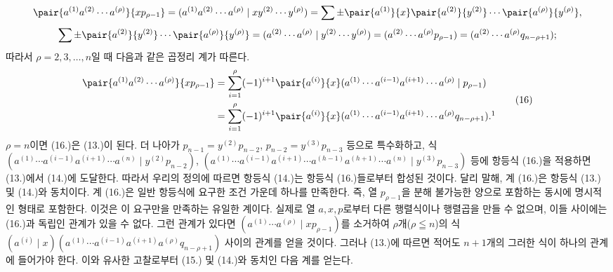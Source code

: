 
\[
\pair{a^{(1)}a^{(2)}\cdots a^{(\rho)}}{xp_{\rho-1}}
=(a^{(1)}a^{(2)}\cdots a^{(\rho)}\mid xy^{(2)}\cdots y^{(\rho)})
=\sum\pm\pair{a^{(1)}}{x}\pair{a^{(2)}}{y^{(2)}}\cdots\pair{a^{(\rho)}}{y^{(\rho)}},
\]
\[
\sum\pm\pair{a^{(2)}}{y^{(2)}}\cdots\pair{a^{(\rho)}}{y^{(\rho)}}
=(a^{(2)}\cdots a^{(\rho)}\mid y^{(2)}\cdots y^{(\rho)})
=(a^{(2)}\cdots a^{(\rho)}p_{\rho-1})=(a^{(2)}\cdots a^{(\rho)}q_{n-\rho+1});
\]
따라서 $\rho=2,3,\ldots,n$일 때 다음과 같은 곱정리 계가 따른다.
\begin{equation}
\begin{aligned}
\pair{a^{(1)}a^{(2)}\cdots a^{(\rho)}}{xp_{\rho-1}}
 &=\sum_{i=1}^{\rho}(-1)^{i+1}\pair{a^{(i)}}{x}(a^{(1)}\cdots a^{(i-1)}a^{(i+1)}\cdots a^{(\rho)}\mid p_{\rho-1})\\
 &=\sum_{i=1}^{\rho}(-1)^{i+1}\pair{a^{(i)}}{x}(a^{(1)}\cdots a^{(i-1)}a^{(i+1)}\cdots a^{(\rho)}q_{n-\rho+1}).\footnotemark
\end{aligned}
\tag{16}
\end{equation}
$\rho=n$이면 (16.)은 (13.)이 된다. 더 나아가 $p_{n-1}=y^{(2)}p_{n-2}$, $p_{n-2}=y^{(3)}p_{n-3}$ 등으로 특수화하고, 식 $(a^{(1)}\cdots a^{(i-1)}a^{(i+1)}\cdots a^{(n)}\mid y^{(2)}p_{n-2})$, $(a^{(1)}\cdots a^{(i-1)}a^{(i+1)}\cdots a^{(h-1)}a^{(h+1)}\cdots a^{(n)}\mid y^{(3)}p_{n-3})$ 등에 항등식 (16.)을 적용하면 (13.)에서 (14.)에 도달한다. 따라서 우리의 정의에 따르면 항등식 (14.)는 항등식 (16.)들로부터 합성된 것이다. 달리 말해, 계 (16.)은 항등식 (13.) 및 (14.)와 동치이다. 계 (16.)은 일반 항등식에 요구한 조건 가운데 하나를 만족한다. 즉, 열 $p_{\rho-1}$을 분해 불가능한 양으로 포함하는 동시에 명시적인 형태로 포함한다. 이것은 이 요구만을 만족하는 유일한 계이다. 실제로 열 $a,x,p$로부터 다른 행렬식이나 행렬곱을 만들 수 없으며, 이들 사이에는 (16.)과 독립인 관계가 있을 수 없다. 그런 관계가 있다면 $(a^{(1)}\cdots a^{(\rho)}\mid xp_{\rho-1})$를 소거하여 $\rho$개($\rho\leqq n$)의 식 $(a^{(i)}\mid x)(a^{(1)}\cdots a^{(i-1)}a^{(i+1)}a^{(\rho)}q_{n-\rho+1})$ 사이의 관계를 얻을 것이다. 그러나 (13.)에 따르면 적어도 $n+1$개의 그러한 식이 하나의 관계에 들어가야 한다. 이와 유사한 고찰로부터 (15.) 및 (14.)와 동치인 다음 계를 얻는다.

